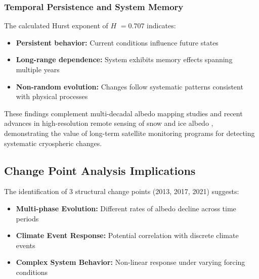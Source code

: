 \documentclass[12pt,a4paper]{article}
\newcommand{\hurst}{$H$}
\begin{document}
\subsubsection{Temporal Persistence and System Memory}

The calculated Hurst exponent of \hurst{} $= 0.707$ indicates:
\begin{itemize}
    \item \textbf{Persistent behavior:} Current conditions influence future states
    \item \textbf{Long-range dependence:} System exhibits memory effects spanning multiple years
    \item \textbf{Non-random evolution:} Changes follow systematic patterns consistent with physical processes
\end{itemize}

These findings complement multi-decadal albedo mapping studies \cite{Ryan2019RockGlacierAlbedo} and recent advances in high-resolution remote sensing of snow and ice albedo \cite{Dumont2021SpectralSentinel, Notarnicola2018SentinelSnow}, demonstrating the value of long-term satellite monitoring programs for detecting systematic cryospheric changes.

\subsection{Change Point Analysis Implications}

The identification of 3 structural change points (2013, 2017, 2021) suggests:
\begin{itemize}
    \item \textbf{Multi-phase Evolution:} Different rates of albedo decline across time periods
    \item \textbf{Climate Event Response:} Potential correlation with discrete climate events
    \item \textbf{Complex System Behavior:} Non-linear response under varying forcing conditions
\end{itemize}
\end{document}
